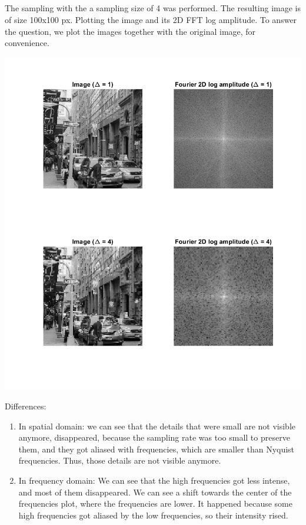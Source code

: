 \documentclass[a4paper]{iacas}
\begin{document}
\subsection{}
The sampling with the a sampling size of 4 was performed. The resulting image is of size 100x100 px. Plotting the image and its 2D FFT log amplitude. To answer the question, we plot the images together with the original image, for convenience.


\vskip 0.1in
\begin{minipage}{1\textwidth}
\centering
	\includegraphics[scale=0.7]{imgs/q1_6.png}
\end{minipage}
\vskip 0.1in

Differences:
\begin{enumerate}
\item In spatial domain: we can see that the details that were small are not visible anymore, disappeared, because the sampling rate was too small to preserve them, and they got aliased with frequencies, which are smaller than Nyquist frequencies. Thus, those details are not visible anymore.
\item In frequency domain: We can see that the high frequencies got less intense, and most of them disappeared. We can see a shift towards the center of the frequencies plot, where the frequencies are lower. It happened because some high frequencies got aliased by the low frequencies, so their intensity rised.
\end{enumerate}
\end{document}
